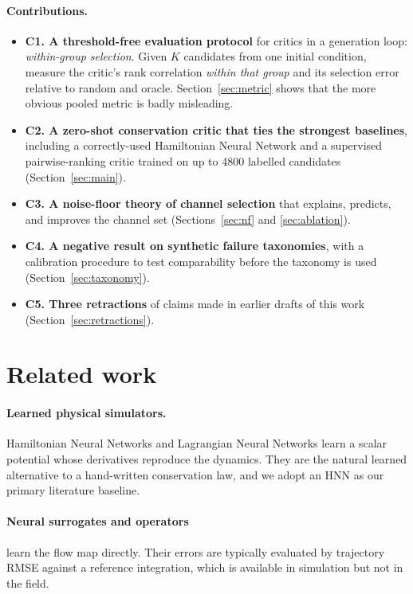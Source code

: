 \documentclass[11pt]{article}
\begin{document}
\paragraph{Contributions.}
\begin{itemize}
  \item \textbf{C1. A threshold-free evaluation protocol} for critics in a generation
    loop: \emph{within-group selection}. Given $K$ candidates from one initial
    condition, measure the critic's rank correlation \emph{within that group} and its
    selection error relative to random and oracle. Section~\ref{sec:metric} shows that
    the more obvious pooled metric is badly misleading.
  \item \textbf{C2. A zero-shot conservation critic that ties the strongest
    baselines}, including a correctly-used Hamiltonian Neural Network and a supervised
    pairwise-ranking critic trained on up to 4800 labelled candidates
    (Section~\ref{sec:main}).
  \item \textbf{C3. A noise-floor theory of channel selection} that explains,
    predicts, and improves the channel set (Sections~\ref{sec:nf} and
    \ref{sec:ablation}).
  \item \textbf{C4. A negative result on synthetic failure taxonomies}, with a
    calibration procedure to test comparability before the taxonomy is used
    (Section~\ref{sec:taxonomy}).
  \item \textbf{C5. Three retractions} of claims made in earlier drafts of this work
    (Section~\ref{sec:retractions}).
\end{itemize}

\section{Related work}

\paragraph{Learned physical simulators.}
Hamiltonian Neural Networks \cite{greydanus2019hnn} and Lagrangian Neural Networks
\cite{cranmer2020lNN} learn a scalar potential whose derivatives reproduce the
dynamics. They are the natural learned alternative to a hand-written conservation law,
and we adopt an HNN as our primary literature baseline.

\paragraph{Neural surrogates and operators} learn the flow map directly. Their errors are
typically evaluated by trajectory RMSE against a reference integration, which is
available in simulation but not in the field.
\end{document}
